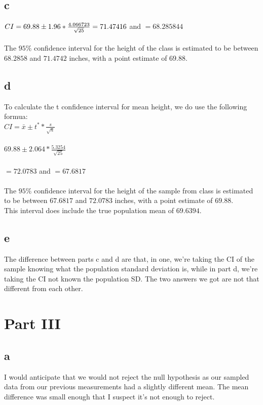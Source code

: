\documentclass[10pt,letterpaper]{article}
\begin{document}
\subsection*{c}
$CI=69.88 \pm 1.96*\frac{4.066723}{\sqrt{25}}\\\\
=71.47416$ and $=68.285844$\\\\
The $95\%$ confidence interval for the height of the class is estimated to be
between $68.2858$ and $71.4742$ inches, with a point estimate of $69.88$.
\subsection*{d}
To calculate the t confidence interval for mean height, we do use the following
formua:\\
$CI=\bar{x}\pm t^* * \frac{s}{\sqrt{n}}$\\\\
$69.88 \pm 2.064*\frac{5.3254}{\sqrt{25}}$\\\\
$=72.0783$ and $=67.6817$\\\\
The $95\%$ confidence interval for the height of the sample from class is
estimated to be between $67.6817$ and $72.0783$ inches, with a point estimate
of $69.88$.\\
This interval does include the true population mean of $69.6394$.\\

\subsection*{e}
The difference between parts c and d are that, in one, we're taking the CI of
the sample knowing what the population standard deviation is, while in part d,
we're taking the CI not known the population SD. The two answers we got are not
that different from each other.

\section*{Part III}
\subsection*{a}
I would anticipate that we would not reject the null hypothesis as our sampled
data from our previous measurements had a slightly different mean. The mean
difference was small enough that I suspect it's not enough to reject.
\end{document}
